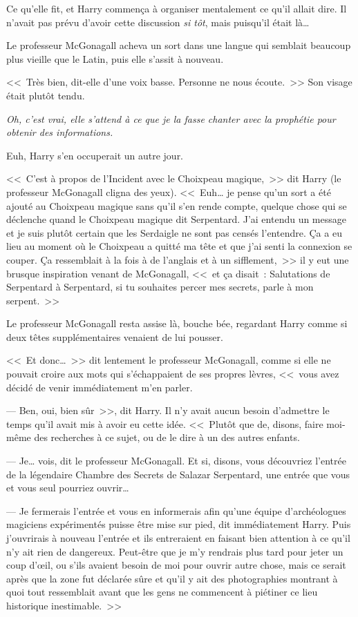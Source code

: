 Ce qu'elle fit, et Harry commença à organiser mentalement ce qu'il allait dire. Il n'avait pas prévu d'avoir cette discussion \emph{si tôt}, mais puisqu'il était là…

Le professeur McGonagall acheva un sort dans une langue qui semblait beaucoup plus vieille que le Latin, puis elle s'assit à nouveau.

<<~Très bien, dit-elle d'une voix basse. Personne ne nous écoute.~>> Son visage était plutôt tendu.

\emph{Oh, c'est vrai, elle s'attend à ce que je la fasse chanter avec la prophétie pour obtenir des informations.}

Euh, Harry s'en occuperait un autre jour.

<<~C'est à propos de l'Incident avec le Choixpeau magique,~>> dit Harry (le professeur McGonagall cligna des yeux). <<~Euh… je pense qu'un sort a été ajouté au Choixpeau magique sans qu'il s'en rende compte, quelque chose qui se déclenche quand le Choixpeau magique dit Serpentard. J'ai entendu un message et je suis plutôt certain que les Serdaigle ne sont pas censés l'entendre. Ça a eu lieu au moment où le Choixpeau a quitté ma tête et que j'ai senti la connexion se couper. Ça ressemblait à la fois à de l'anglais et à un sifflement,~>> il y eut une brusque inspiration venant de McGonagall, <<~et ça disait~: Salutations de Serpentard à Serpentard, si tu souhaites percer mes secrets, parle à mon serpent.~>>

Le professeur McGonagall resta assise là, bouche bée, regardant Harry comme si deux têtes supplémentaires venaient de lui pousser.

<<~Et donc…~>> dit lentement le professeur McGonagall, comme si elle ne pouvait croire aux mots qui s'échappaient de ses propres lèvres, <<~vous avez décidé de venir immédiatement m'en parler.

--- Ben, oui, bien sûr~>>, dit Harry. Il n'y avait aucun besoin d'admettre le temps qu'il avait mis à avoir eu cette idée. <<~Plutôt que de, disons, faire moi-même des recherches à ce sujet, ou de le dire à un des autres enfants.

--- Je… vois, dit le professeur McGonagall. Et si, disons, vous découvriez l'entrée de la légendaire Chambre des Secrets de Salazar Serpentard, une entrée que vous et vous seul pourriez ouvrir…

--- Je fermerais l'entrée et vous en informerais afin qu'une équipe d'archéologues magiciens expérimentés puisse être mise sur pied, dit immédiatement Harry. Puis j'ouvrirais à nouveau l'entrée et ils entreraient en faisant bien attention à ce qu'il n'y ait rien de dangereux. Peut-être que je m'y rendrais plus tard pour jeter un coup d'œil, ou s'ils avaient besoin de moi pour ouvrir autre chose, mais ce serait après que la zone fut déclarée sûre et qu'il y ait des photographies montrant à quoi tout ressemblait avant que les gens ne commencent à piétiner ce lieu historique inestimable.~>>

